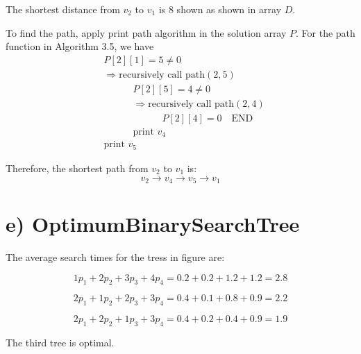 \documentclass[natbib,12pt]{article}
\begin{document}
The shortest distance from $v_2$ to $v_1$ is 8 shown as shown in array $D$. 

To find the path, apply print path algorithm in the solution array $P$. For the path function in Algorithm 3.5, we have
\begin{equation*}
\begin{split}
&P[2][1] = 5 \ne 0 \\
&\Rightarrow \textrm{recursively call path} (2, 5) \\
&\quad \quad \quad  P[2][5] = 4 \ne 0 \\
&\quad \quad \quad  \Rightarrow \textrm{recursively call path} (2, 4) \\
&\quad \quad \quad \quad \quad \quad  P[2][4] = 0 \quad \textrm{END} \\
&\quad \quad \quad  \textrm{print } v_4 \\
&\textrm{print } v_5
\end{split}
\end{equation*}

Therefore, the shortest path from $v_2$ to $v_1$ is:
\begin{equation*}
v_2 \rightarrow v_4 \rightarrow v_5 \rightarrow v_1
\end{equation*}
	
	


	

	
	
	\newpage
	\section*{e) OptimumBinarySearchTree}
	
	The average search times for the tress in figure are:
	
	\begin{equation}
	 1p_1 + 2p_2 + 3p_3 + 4p_4 = 0.2 + 0.2 + 1.2 + 1.2 = 2.8
	\end{equation}
	
	\begin{equation}
	2p_1 + 1p_2 + 2p_3 + 3p_4 = 0.4 + 0.1 + 0.8 + 0.9 = 2.2
	\end{equation}

	\begin{equation}
	2p_1 + 2p_2 + 1p_3 + 3p_4 = 0.4 + 0.2 + 0.4 + 0.9 = 1.9
	\end{equation}
	
	The third tree is optimal.
	
\end{document}
